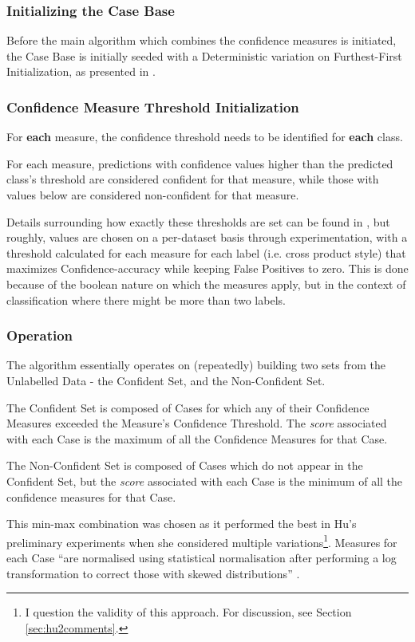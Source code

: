 \documentclass[a4paper,11pt]{report}
\begin{document}
\subsubsection{Initializing the Case Base}
Before the main algorithm which combines the confidence measures is initiated, the Case Base is initially seeded with a Deterministic variation on Furthest-First Initialization, as presented in \citet{Greene2007}.

\subsubsection{Confidence Measure Threshold Initialization}
For \textbf{each} measure, the confidence threshold needs to be identified for \textbf{each} class.

For each measure, predictions with confidence values higher than the predicted class's threshold are considered confident for that measure, while those with values below are considered non-confident for that measure.

Details surrounding how exactly these thresholds are set can be found in \citet{Delany2005}, but roughly, values are chosen on a per-dataset basis through experimentation, with a threshold calculated for each measure for each label (i.e. cross product style) that maximizes Confidence-accuracy while keeping False Positives to zero. This is done because of the boolean nature on which the measures apply, but in the context of classification where there might be more than two labels. 

\subsubsection{Operation}
The algorithm essentially operates on (repeatedly) building two sets from the Unlabelled Data - the Confident Set, and the Non-Confident Set.

The Confident Set is composed of Cases for which any of their Confidence Measures exceeded the Measure's Confidence Threshold. The \emph{score} associated with each Case is the maximum of all the Confidence Measures for that Case.

The Non-Confident Set is composed of Cases which do not appear in the Confident Set, but the \emph{score} associated with each Case is the minimum of all the confidence measures for that Case. 

This min-max combination was chosen as it performed the best in Hu's preliminary experiments when she considered multiple variations\footnote{I question the validity of this approach. For discussion, see Section \ref{sec:hu2comments}.}. Measures for each Case ``are normalised using statistical normalisation after performing a log transformation to correct those with skewed distributions'' \citep{Hu2011}.
\end{document}
